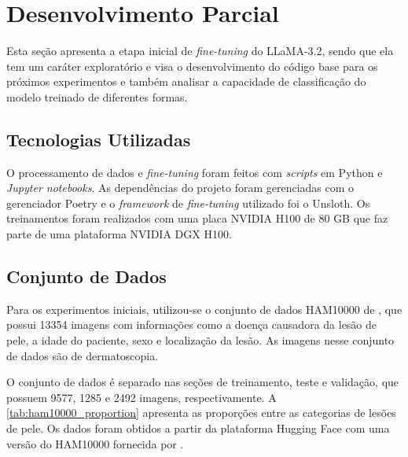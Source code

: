 \chapter{Desenvolvimento Parcial} %

Esta seção apresenta a etapa inicial de \textit{fine-tuning} do \ac{LLaMA}-3.2, sendo que ela tem um caráter
exploratório e visa o desenvolvimento do código base para os próximos experimentos e também analisar a capacidade de
classificação do modelo treinado de diferentes formas.

\section{Tecnologias Utilizadas}

O processamento de dados e \textit{fine-tuning} foram feitos com \textit{scripts} em Python e \textit{Jupyter
notebooks}. As dependências do projeto foram gerenciadas com o gerenciador Poetry e o \textit{framework} de
\textit{fine-tuning} utilizado foi o Unsloth. Os treinamentos foram realizados com uma placa NVIDIA H100 de 80 GB que
faz parte de uma plataforma NVIDIA DGX H100.

\section{Conjunto de Dados}

Para os experimentos iniciais, utilizou-se o conjunto de dados \ac{HAM10000} de \textcite{tschandl2018ham10000}, que
possui 13354 imagens com informações como a doença causadora da lesão de pele, a idade do paciente, sexo e localização
da lesão. As imagens nesse conjunto de dados são de dermatoscopia.

O conjunto de dados é separado nas seções de treinamento, teste e validação, que possuem 9577, 1285 e 2492 imagens,
respectivamente. A \autoref{tab:ham10000_proportion} apresenta as proporções entre as categorias de lesões de pele. Os
dados foram obtidos a partir da plataforma Hugging Face com uma versão do \ac{HAM10000} fornecida por
\textcite{skin_cancer_dataset}.

